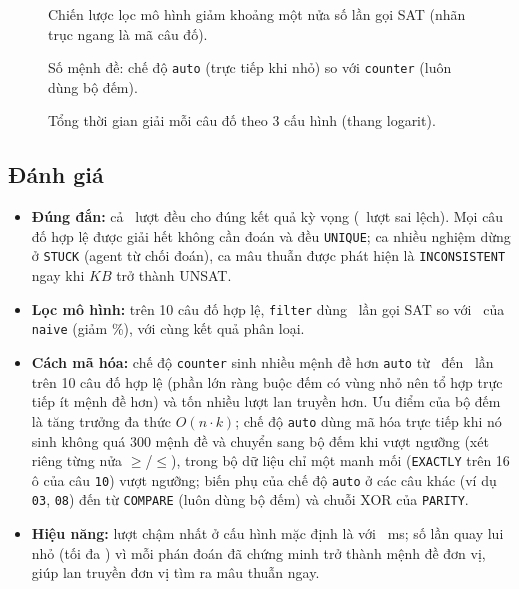 \documentclass{article}
\newcommand{\code}[1]{\texttt{#1}}
\newcommand{\KB}{\mathit{KB}}
\begin{document}


\begin{figure}[!htbp]
\centering
\ChartSat
\caption{Chiến lược lọc mô hình giảm khoảng một nửa số lần gọi SAT (nhãn trục ngang là mã câu đố).}
\end{figure}
\begin{figure}[!htbp]
\centering
\ChartClauses
\caption{Số mệnh đề: chế độ \code{auto} (trực tiếp khi nhỏ) so với \code{counter} (luôn dùng bộ đếm).}
\end{figure}
\begin{figure}[!htbp]
\centering
\ChartRuntime
\caption{Tổng thời gian giải mỗi câu đố theo 3 cấu hình (thang logarit).}
\end{figure}

\subsection{Đánh giá}
\begin{itemize}
    \item \textbf{Đúng đắn:} cả \NumRuns\ lượt đều cho đúng kết quả kỳ vọng (\Unexpected\ lượt sai lệch). Mọi câu đố hợp lệ được giải hết không cần đoán và đều \code{UNIQUE}; ca nhiều nghiệm dừng ở \code{STUCK} (agent từ chối đoán), ca mâu thuẫn được phát hiện là \code{INCONSISTENT} ngay khi $\KB$ trở thành UNSAT.
    \item \textbf{Lọc mô hình:} trên 10 câu đố hợp lệ, \code{filter} dùng \FilterSat\ lần gọi SAT so với \NaiveSat\ của \code{naive} (giảm \SatSaving\%), với cùng kết quả phân loại.
    \item \textbf{Cách mã hóa:} chế độ \code{counter} sinh nhiều mệnh đề hơn \code{auto} từ \CounterMin\ đến \CounterMax\ lần trên 10 câu đố hợp lệ (phần lớn ràng buộc đếm có vùng nhỏ nên tổ hợp trực tiếp ít mệnh đề hơn) và tốn nhiều lượt lan truyền hơn. Ưu điểm của bộ đếm là tăng trưởng đa thức $O(n\cdot k)$; chế độ \code{auto} dùng mã hóa trực tiếp khi nó sinh không quá 300 mệnh đề và chuyển sang bộ đếm khi vượt ngưỡng (xét riêng từng nửa $\ge$/$\le$), trong bộ dữ liệu chỉ một manh mối (\code{EXACTLY} trên 16 ô của câu \code{10}) vượt ngưỡng; biến phụ của chế độ \code{auto} ở các câu khác (ví dụ \code{03}, \code{08}) đến từ \code{COMPARE} (luôn dùng bộ đếm) và chuỗi XOR của \code{PARITY}.
    \item \textbf{Hiệu năng:} lượt chậm nhất ở cấu hình mặc định là \code{\SlowPuzzle} với \SlowMs\ ms; số lần quay lui nhỏ (tối đa \MaxBacktracks) vì mỗi phán đoán đã chứng minh trở thành mệnh đề đơn vị, giúp lan truyền đơn vị tìm ra mâu thuẫn ngay.
\end{itemize}
\end{document}
